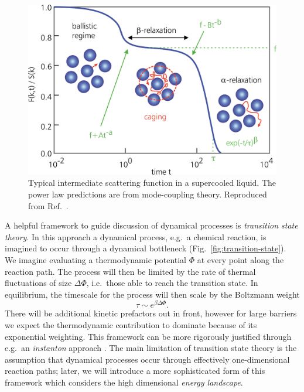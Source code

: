 \documentclass[11pt,twoside]{report}
\begin{document}
\begin{figure}
  \includegraphics[width=0.9\linewidth,outer]{isf}
  \caption[Intermediate scattering function in a supercooled liquid]{
    Typical intermediate scattering function in a supercooled liquid.
    The power law predictions are from mode-coupling theory.
    Reproduced from Ref.\ \cite{JanssenFP2018}.
  }
  \label{fig:isf}
\end{figure}

A helpful framework to guide discussion of dynamical processes is \emph{transition state theory}.
In this approach a dynamical process, e.g.\ a chemical reaction, is imagined to occur through a dynamical bottleneck (Fig.\ \ref{fig:transition-state}).
We imagine evaluating a thermodynamic potential%
$\Phi$ at every point along the reaction path.
The process will then be limited by the rate of thermal fluctuations of size $\Delta \Phi$, i.e.\ those able to reach the transition state.
In equilibrium, the timescale for the process will then scale by the Boltzmann weight
\begin{equation}\label{eq:reaction-time}
  \tau \sim e^{\beta \Delta \Phi}.
\end{equation}
There will be additional kinetic prefactors out in front, however for large barriers we expect the thermodynamic contribution to dominate because of its exponential weighting.
This framework can be more rigorously justified through e.g.\ an \emph{instanton} approach \cite{LangerAP1969}.
The main limitation of transition state theory is the assumption that dynamical processes occur through effectively one-dimensional reaction paths; later, we will introduce a more sophisticated form of this framework which considers the high dimensional \emph{energy landscape}.
\end{document}
